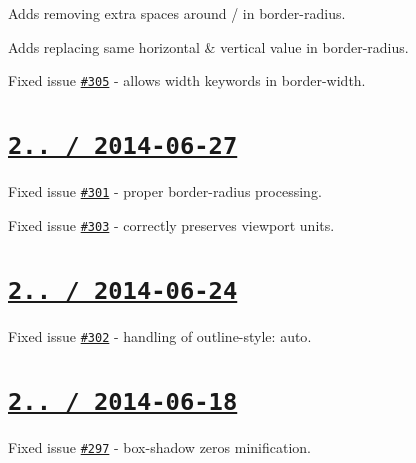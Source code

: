 \begin{DoxyItemize}
\item Adds removing extra spaces around / in border-\/radius.
\item Adds replacing same horizontal \& vertical value in border-\/radius.
\item Fixed issue \href{https://github.com/jakubpawlowicz/clean-css/issues/305}{\tt \#305} -\/ allows width keywords in {\ttfamily border-\/width}.
\end{DoxyItemize}

\section*{\href{https://github.com/jakubpawlowicz/clean-css/compare/v2.2.3...v2.2.4}{\tt 2.. / 2014-\/06-\/27} }


\begin{DoxyItemize}
\item Fixed issue \href{https://github.com/jakubpawlowicz/clean-css/issues/301}{\tt \#301} -\/ proper {\ttfamily border-\/radius} processing.
\item Fixed issue \href{https://github.com/jakubpawlowicz/clean-css/issues/303}{\tt \#303} -\/ correctly preserves viewport units.
\end{DoxyItemize}

\section*{\href{https://github.com/jakubpawlowicz/clean-css/compare/v2.2.2...v2.2.3}{\tt 2.. / 2014-\/06-\/24} }


\begin{DoxyItemize}
\item Fixed issue \href{https://github.com/jakubpawlowicz/clean-css/issues/302}{\tt \#302} -\/ handling of {\ttfamily outline-\/style\+: auto}.
\end{DoxyItemize}

\section*{\href{https://github.com/jakubpawlowicz/clean-css/compare/v2.2.1...v2.2.2}{\tt 2.. / 2014-\/06-\/18} }


\begin{DoxyItemize}
\item Fixed issue \href{https://github.com/jakubpawlowicz/clean-css/issues/297}{\tt \#297} -\/ {\ttfamily box-\/shadow} zeros minification.
\end{DoxyItemize}

